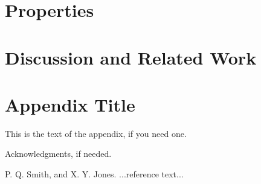 \documentclass[preprint]{sigplanconf}
\begin{document}
\section{Properties}

\section{Discussion and Related Work}

\appendix
\section{Appendix Title}

This is the text of the appendix, if you need one.

\acks

Acknowledgments, if needed.





\begin{thebibliography}{}
\softraggedright

P. Q. Smith, and X. Y. Jones. ...reference text...

\end{thebibliography}
\end{document}

